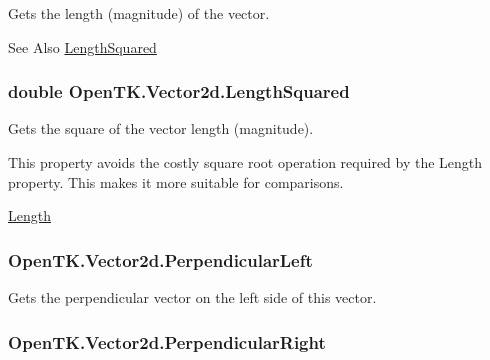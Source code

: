 Gets the length (magnitude) of the vector. 

\begin{DoxySeeAlso}{See Also}
\hyperlink{struct_open_t_k_1_1_vector2d_abbca0e5c823caed814092dd1d7fadc23}{Length\-Squared}


\end{DoxySeeAlso}
\hypertarget{struct_open_t_k_1_1_vector2d_abbca0e5c823caed814092dd1d7fadc23}{
\subsubsection[{Length\-Squared}]{\setlength{\rightskip}{0pt plus 5cm}double Open\-T\-K.\-Vector2d.\-Length\-Squared\hspace{0.3cm}{\ttfamily [get]}}}\label{struct_open_t_k_1_1_vector2d_abbca0e5c823caed814092dd1d7fadc23}


Gets the square of the vector length (magnitude). 

This property avoids the costly square root operation required by the Length property. This makes it more suitable for comparisons. 

\hyperlink{struct_open_t_k_1_1_vector2d_a95c8cd7d1f964c7fb7e7ef0acf1487e4}{Length} \hypertarget{struct_open_t_k_1_1_vector2d_a759a3f93398ef84bf5510c2e486c2f03}{
\subsubsection[{Perpendicular\-Left}]{ Open\-T\-K.\-Vector2d.\-Perpendicular\-Left\hspace{0.3cm}{\ttfamily [get]}}}\label{struct_open_t_k_1_1_vector2d_a759a3f93398ef84bf5510c2e486c2f03}


Gets the perpendicular vector on the left side of this vector. 

\hypertarget{struct_open_t_k_1_1_vector2d_abcbb2f176283994317680ca8e8a336b3}{
\subsubsection[{Perpendicular\-Right}]{ Open\-T\-K.\-Vector2d.\-Perpendicular\-Right\hspace{0.3cm}{\ttfamily [get]}}}\label{struct_open_t_k_1_1_vector2d_abcbb2f176283994317680ca8e8a336b3}


